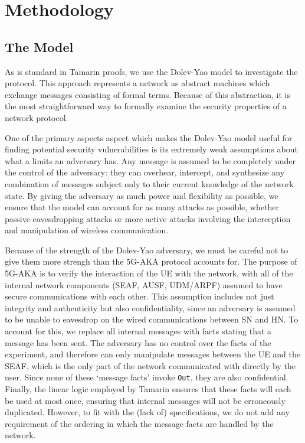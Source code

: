 \documentclass[10pt, pdftex]{article}
\begin{document}
\section{Methodology}

\subsection{The Model}

As is standard in Tamarin proofs, we use the Dolev-Yao model to investigate the protocol. This approach represents a network as abstract machines which exchange messages consisting of formal terms. Because of this abstraction, it is the most straightforward way to formally examine the security properties of a network protocol.

One of the primary aspects aspect which makes the Dolev-Yao model useful for finding potential security vulnerabilities is its extremely weak assumptions about what a limits an adversary has. Any message is assumed to be completely under the control of the adversary: they can overhear, intercept, and synthesize any combination of messages subject only to their current knowledge of the network state. By giving the adversary as much power and flexibility as possible, we ensure that the model can account for as many attacks as possible, whether passive eavesdropping attacks or more active attacks involving the interception and manipulation of wireless communication.

Because of the strength of the Dolev-Yao adversary, we must be careful not to give them more strengh than the 5G-AKA protocol accounts for. The purpose of 5G-AKA is to verify the interaction of the UE with the network, with all of the internal network components (SEAF, AUSF, UDM/ARPF) assumed to have secure communications with each other. This assumption includes not just integrity and authenticity but also confidentiality, since an adversary is assumed to be unable to eavesdrop on the wired communications between SN and HN. To account for this, we replace all internal messages with facts stating that a message has been sent. The adversary has no control over the facts of the experiment, and therefore can only manipulate messages between the UE and the SEAF, which is the only part of the network communicated with directly by the user. Since none of these `message facts' invoke \verb|Out|, they are also confidential. Finally, the linear logic employed by Tamarin ensures that these facts will each be used at most once, ensuring that internal messages will not be erroneously duplicated. However, to fit with the (lack of) specifications, we do not add any requirement of the ordering in which the message facts are handled by the network.
\end{document}
